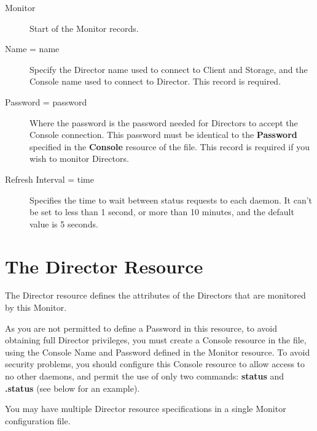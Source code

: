 \begin{description}

\item [Monitor]
   Start of the Monitor records. 

\item [Name = \lt{}name\gt{}]
   Specify the Director name used to connect  to Client and Storage, and the
Console name used to connect to Director.  This record is required. 

\item [Password = \lt{}password\gt{}]
   Where the password is the  password needed for Directors to accept the Console
connection.  This password must be identical to the {\bf Password} specified
in  the {\bf Console} resource of the 
 file. This 
record is required if you wish to monitor Directors. 

\item [Refresh Interval = \lt{}time\gt{}]
   Specifies the time to wait  between status requests to each daemon. It can't
be set to less than  1 second, or more than 10 minutes, and the default value
is 5 seconds. 
\end{description}

\section{The Director Resource}
\label{DirectorResource2}

The Director resource defines the attributes of the Directors that are
monitored by this Monitor.

As you are not permitted to define a Password in this resource, to avoid
obtaining full Director privileges, you must create a Console resource in the 
 file, using the
Console Name and Password defined in the Monitor resource. To avoid security
problems, you should configure this Console resource to allow access to no
other daemons, and permit the use of only two commands: {\bf status} and {\bf
.status} (see below for an example).

You may have multiple Director resource specifications in a single Monitor
configuration file. 

